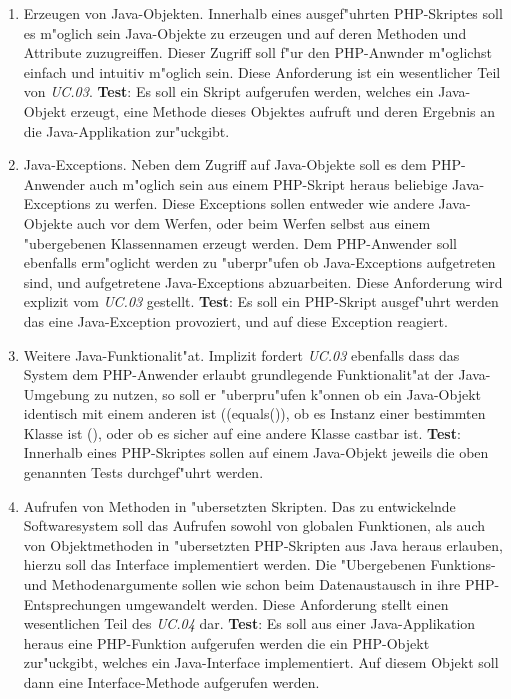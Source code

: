 \begin{enumerate}
\item Erzeugen von Java-Objekten. Innerhalb eines ausgef"uhrten PHP-Skriptes soll es m"oglich sein Java-Objekte zu erzeugen und auf
    deren Methoden und Attribute zuzugreiffen. Dieser Zugriff soll f"ur den PHP-Anwnder m"oglichst einfach und intuitiv m"oglich sein.
    Diese Anforderung ist ein wesentlicher Teil von \emph{UC.03}.
    \textbf{Test}: Es soll ein Skript aufgerufen werden, welches ein Java-Objekt erzeugt, eine Methode dieses Objektes aufruft und
    deren Ergebnis an die Java-Applikation zur"uckgibt.

\item Java-Exceptions. Neben dem Zugriff auf Java-Objekte soll es dem PHP-Anwender auch m"oglich sein aus einem
    PHP-Skript heraus beliebige Java-Exceptions zu werfen. Diese Exceptions sollen entweder wie andere Java-Objekte auch vor dem Werfen,
    oder beim Werfen selbst aus einem "ubergebenen Klassennamen erzeugt werden. Dem PHP-Anwender soll ebenfalls erm"oglicht werden
    zu "uberpr"ufen ob Java-Exceptions aufgetreten sind, und aufgetretene Java-Exceptions abzuarbeiten.
    Diese Anforderung wird explizit vom \emph{UC.03} gestellt.
    \textbf{Test}: Es soll ein PHP-Skript ausgef"uhrt werden das eine Java-Exception provoziert, und auf diese Exception reagiert.

\item Weitere Java-Funktionalit"at. Implizit fordert \emph{UC.03} ebenfalls dass das System dem PHP-Anwender erlaubt grundlegende
    Funktionalit"at der Java-Umgebung zu nutzen, so soll er "uberpru"ufen k"onnen ob ein Java-Objekt identisch mit einem anderen ist
    (\ident(equals()), ob es Instanz einer bestimmten Klasse ist (), oder ob es sicher auf eine andere Klasse castbar ist.
    \textbf{Test}: Innerhalb eines PHP-Skriptes sollen auf einem Java-Objekt jeweils die oben genannten Tests durchgef"uhrt werden.

\item Aufrufen von Methoden in "ubersetzten Skripten. Das zu entwickelnde Softwaresystem soll das Aufrufen sowohl von globalen Funktionen,
    als auch von Objektmethoden in "ubersetzten PHP-Skripten aus Java heraus erlauben, hierzu soll das Interface  
    implementiert werden. Die "Ubergebenen Funktions- und Methodenargumente sollen wie schon beim Datenaustausch in ihre PHP-Entsprechungen
    umgewandelt werden. Diese Anforderung stellt einen wesentlichen Teil des \emph{UC.04} dar.
    \textbf{Test}: Es soll aus einer Java-Applikation heraus eine PHP-Funktion aufgerufen werden die ein PHP-Objekt zur"uckgibt, welches
    ein Java-Interface implementiert. Auf diesem Objekt soll dann eine Interface-Methode aufgerufen werden.


\end{enumerate}
